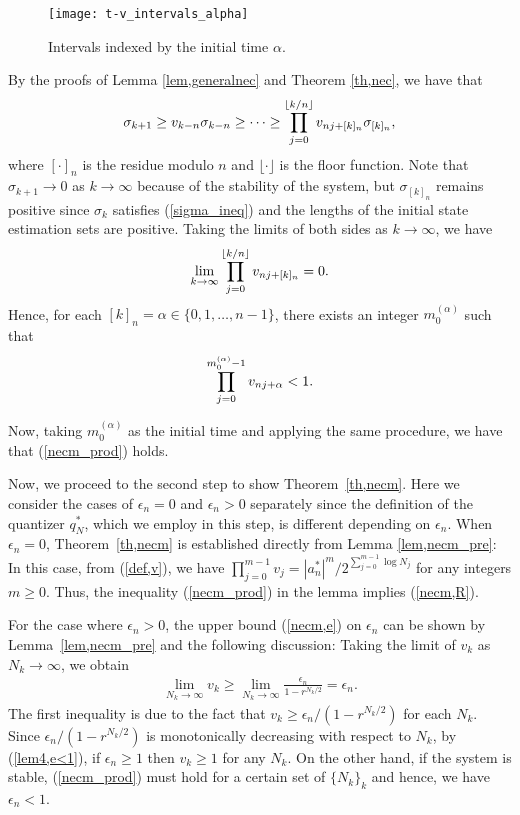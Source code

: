 \documentclass[a4paper, 11pt]{article}
\makeatletter
\theoremstyle{definition}
\newenvironment{pf}[1][\proofname]{\par\pushQED{\qed}
 \normalfont\topsep6\p@\@plus6\p@\relax\trivlist\item[\hskip\labelsep\bfseries#1\@addpunct{.}]
 \ignorespaces}{\popQED\endtrivlist\@endpefalse}
\makeatother
\begin{document}
\begin{figure}[t]
 \centering
 \texttt{[image: t-v\_intervals\_alpha]}
 \caption{Intervals indexed by the initial time $\alpha$.}
 \label{fig,t-v_intervals_alpha}
\end{figure}

\begin{pf}[Proof of Lemma~\ref{lem,necm_pre}]
By the proofs of Lemma \ref{lem,generalnec} and Theorem \ref{th,nec}, we have that
\begin{align}
 \sigma_{k+1} \geq v_{k-n}\sigma_{k-n} \geq \cdots \geq
 \prod_{j=0}^{\lfloor k/n\rfloor}v_{nj+[k]_n}\sigma_{[k]_n},\notag
\end{align}
where $[\cdot]_n$ is the residue modulo $n$ and $\lfloor\cdot\rfloor$
is the floor function.
Note that $\sigma_{k+1}\to0$ as $k\to\infty$ because of the stability of the system,
but $\sigma_{[k]_n}$ remains positive since $\sigma_k$ satisfies (\ref{sigma_ineq})
and the lengths of the initial state estimation sets are positive.
Taking the limits of both sides as $k\to\infty$, we have 
\begin{align}
 \lim_{k\to\infty}\prod_{j=0}^{\lfloor k/n\rfloor}v_{nj+[k]_n}=0.\notag \end{align}
Hence, for each $[k]_n=\alpha\in\{0,1,\dots,n-1\}$, there exists an integer
$m^{(\alpha)}_{0}$ such that
\begin{align}
 \prod_{j=0}^{m^{(\alpha)}_{0}-1}v_{nj+\alpha}<1.\notag
\end{align}

Now, taking $m^{(\alpha)}_{0}$ as the initial time and applying the same procedure,
we have that (\ref{necm_prod}) holds.
\end{pf}


Now, we proceed to the second step to show Theorem~\ref{th,necm}.
Here we consider the cases of $\epsilon_n=0$ and $\epsilon_n>0$ separately
since the definition of the quantizer $q^*_N$, which we employ in this step,
is different depending on $\epsilon_n$.
When $\epsilon_n=0$, Theorem~\ref{th,necm} is established directly from
Lemma \ref{lem,necm_pre}:
In this case, from (\ref{def,v}), we have
$\prod_{j=0}^{m-1} v_j=|a_n^*|^{m}/2^{\sum_{j=0}^{m-1}\log N_j}$ for any
integers $m\geq0$.
Thus, the inequality (\ref{necm_prod}) in the lemma implies (\ref{necm,R}).

For the case where $\epsilon_n>0$, the upper bound (\ref{necm,e}) on
$\epsilon_n$ can be shown
by Lemma~\ref{lem,necm_pre} and the following discussion:
Taking the limit of $v_k$ as $N_k\to\infty$, we obtain
\begin{align}
 \lim_{N_k\to\infty}v_k
 \geq\lim_{N_k\to\infty}\frac{\epsilon_n}{1-r^{N_k/2}}
 =\epsilon_n.\label{lem4,e<1}\end{align}
The first inequality is due to the fact that $v_k\geq\epsilon_n/(1-r^{N_k/2})$
for each $N_k$.
Since $\epsilon_n/(1-r^{N_k/2})$ is monotonically decreasing with respect
to $N_k$, by (\ref{lem4,e<1}), if $\epsilon_n\geq 1$ then $v_k\geq1$ for any $N_k$.
On the other hand, if the system is stable, (\ref{necm_prod}) must hold
for a certain set of $\{N_k\}_k$ and hence, we have $\epsilon_n<1$.
\end{document}
